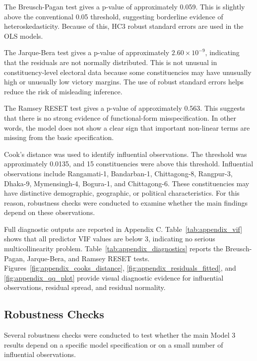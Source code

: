 \documentclass[12pt,a4paper]{article}
\begin{document}
The Breusch-Pagan test gives a p-value of approximately 0.059. This is slightly above the conventional 0.05 threshold, suggesting borderline evidence of heteroskedasticity. Because of this, HC3 robust standard errors are used in the OLS models.

The Jarque-Bera test gives a p-value of approximately \(2.60 \times 10^{-9}\), indicating that the residuals are not normally distributed. This is not unusual in constituency-level electoral data because some constituencies may have unusually high or unusually low victory margins. The use of robust standard errors helps reduce the risk of misleading inference.

The Ramsey RESET test gives a p-value of approximately 0.563. This suggests that there is no strong evidence of functional-form misspecification. In other words, the model does not show a clear sign that important non-linear terms are missing from the basic specification.

Cook's distance was used to identify influential observations. The threshold was approximately 0.0135, and 15 constituencies were above this threshold. Influential observations include Rangamati-1, Bandarban-1, Chittagong-8, Rangpur-3, Dhaka-9, Mymensingh-4, Bogura-1, and Chittagong-6. These constituencies may have distinctive demographic, geographic, or political characteristics. For this reason, robustness checks were conducted to examine whether the main findings depend on these observations.

Full diagnostic outputs are reported in Appendix C. Table~\ref{tab:appendix_vif} shows that all predictor VIF values are below 3, indicating no serious multicollinearity problem. Table~\ref{tab:appendix_diagnostics} reports the Breusch-Pagan, Jarque-Bera, and Ramsey RESET tests. Figures~\ref{fig:appendix_cooks_distance}, \ref{fig:appendix_residuals_fitted}, and \ref{fig:appendix_qq_plot} provide visual diagnostic evidence for influential observations, residual spread, and residual normality.
% 

\subsection{Robustness Checks}

Several robustness checks were conducted to test whether the main Model 3 results depend on a specific model specification or on a small number of influential observations.
\end{document}
